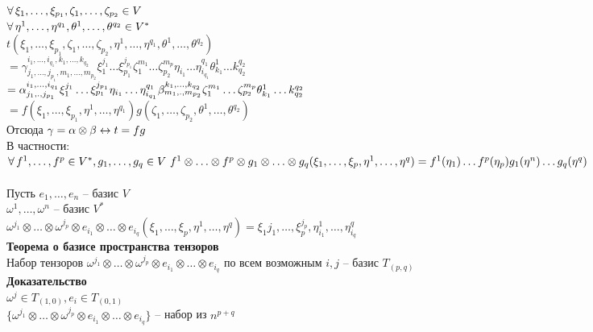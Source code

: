 \documentclass[12pt]{article}
\begin{document}
$\forall\, \xi_1, \ldots, \xi_{p_1}, \zeta_1,\ldots, \zeta_{p_2} \in V$\\
$\forall\, \eta^1,\ldots, \eta^{q_1}, \theta^1,\ldots, \theta^{q_2} \in V^*$\\
$t(\xi_1, \ldots, \xi_{p_1}, \zeta_1,\ldots, \zeta_{p_2}, \eta^1,\ldots, \eta^{q_1}, \theta^1,\ldots, \theta^{q_2})$\\
$ = \gamma_{j_1,\ldots,j_{p_1},m_1, \ldots, m_{p_2}}^{i_1,\ldots, i_{q_1},k_1,\ldots,k_{q_2}} \xi_1^{j_1}\ldots \xi_{p_1}^{j_{p_1}}\zeta_1^{m_1}\ldots \zeta_{p_2}^{m_p}\eta_{i_1}\ldots \eta_{i_{q_1}}^{q_1}\theta_{k_1}^1\ldots k_{q_2}^{q_2}$\\
$=\alpha_{j_1, \ldotp, j_{p_1}}^{i_1, \ldots, i_{q_1}}\xi_1^{j_1}\ldots \xi_{p_1}^{j_{p_1}}\eta_{i_1}\ldots \eta_{i_{q_1}}^{q_1}\beta_{m_1, \ldotp, m_{p_2}}^{k_1, \ldots, k_{q_2}}\zeta_1^{m_1}\ldots \zeta_{p_2}^{m_p}\theta_{k_1}^1\ldots k_{q_2}^{q_2}$\\
$= f(\xi_1, \ldots, \xi_{p_1},\eta^1,\ldots, \eta^{q_1})g(\zeta_1,\ldots, \zeta_{p_2}, \theta^1,\ldots, \theta^{q_2})$\\
Отсюда $\gamma = \alpha \otimes \beta \leftrightarrow t=fg$\\
В частности:\\
$\forall\, f^1,\ldots,f^p \in V^*, g_1, \ldots, g_q \in V\ f^1 \otimes \ldots \otimes f^p \otimes g_1 \otimes \ldots \otimes g_q(\xi_1,\ldots,\xi_p, \eta^1,\ldots,\eta^q) = f^1(\eta_1)\ldots f^p(\eta_p)g_1(\eta^n)\ldots g_q(\eta^q)$\\\\
Пусть $e_1, \ldots, e_n$ -- базис $V$\\
$\omega^1, \ldots, \omega^n$ -- базис $V^*$\\
$\omega^{j_1}\otimes \ldots \otimes \omega^{j_p} \otimes e_{i_1}\otimes\ldots \otimes e_{i_q} (\xi_1,\ldots, \xi_p, \eta^1,\ldots, \eta^q) = \xi_1{j_1},\ldots, \xi_p^{j_p}, \eta^1_{i_1},\ldots, \eta^q_{i_q}$\\
\textbf{Теорема о базисе пространства тензоров}\\
Набор тензоров $\omega^{j_1}\otimes \ldots \otimes \omega^{j_p} \otimes e_{i_1} \otimes \ldots \otimes e_{i_q}$ по всем возможным $i, j$ -- базис $T_{(p,q)}$\\
\textbf{Доказательство}\\
$\omega^j \in T_{(1,0)}, e_i \in T_{(0,1)}$\\
$\{\omega^{j_1}\otimes \ldots \otimes \omega^{j_p} \otimes e_{i_1} \otimes \ldots \otimes e_{i_q}\}$ -- набор из $n^{p+q}$\\
\end{document}
